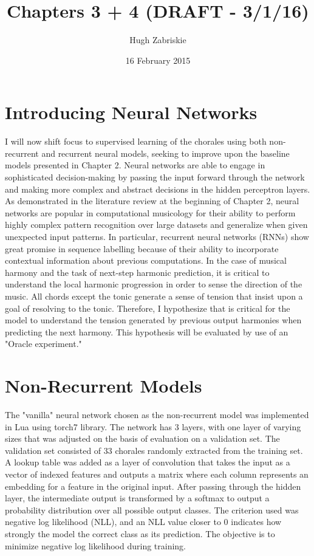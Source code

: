 \documentclass[11pt]{article}
\title{Chapters 3 + 4 (DRAFT - 3/1/16)}
\author{Hugh Zabriskie}
\date{16 February 2015}
\begin{document}
\maketitle{}


\section{Introducing Neural Networks}

I will now shift focus to supervised learning of the chorales using both non-recurrent and recurrent neural models, seeking to improve upon the baseline models presented in Chapter 2. Neural networks are able to engage in sophisticated decision-making by passing the input forward through the network and making more complex and abstract decisions in the hidden perceptron layers. As demonstrated in the literature review at the beginning of Chapter 2, neural networks are popular in computational musicology for their ability to perform highly complex pattern recognition over large datasets and generalize when given unexpected input patterns. In particular, recurrent neural networks (RNNs) show great promise in sequence labelling because of their ability to incorporate contextual information about previous computations. In the case of musical harmony and the task of next-step harmonic prediction, it is critical to understand the local harmonic progression in order to sense the direction of the music. All chords except the tonic generate a sense of tension that insist upon a goal of resolving to the tonic. Therefore, I hypothesize that is critical for the model to understand the tension generated by previous output harmonies when predicting the next harmony. This hypothesis will be evaluated by use of an "Oracle experiment."

\section{Non-Recurrent Models}

The "vanilla" neural network chosen as the non-recurrent model was implemented in Lua using torch7 library. The network has 3 layers, with one layer of varying sizes that was adjusted on the basis of evaluation on a validation set. The validation set consisted of 33 chorales randomly extracted from the training set. A lookup table was added as a layer of convolution that takes the input as a vector of indexed features and outputs a matrix where each column represents an embedding for a feature in the original input. After passing through the hidden layer, the intermediate output is transformed by a softmax to output a probability distribution over all possible output classes. The criterion used was negative log likelihood (NLL), and an NLL value closer to 0 indicates how strongly the model the correct class as its prediction. The objective is to minimize negative log likelihood during training.\\
\end{document}
